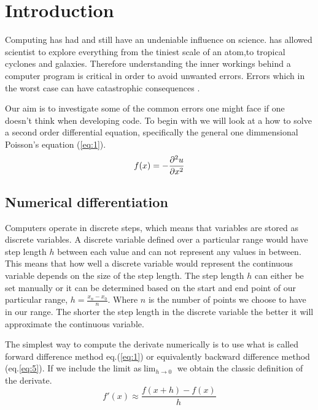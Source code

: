 \section*{Introduction}
Computing has had and still have an undeniable influence on science.
has allowed scientist to explore everything from the tiniest scale of an atom,to
tropical cyclones and galaxies.
Therefore understanding the inner workings behind a computer program is critical
in order to avoid unwanted errors. Errors which in the worst case can have
catastrophic consequences \cite{sleipner_failure}. \par Our aim is to
investigate some of the common errors one might face if one doesn't think when
developing code. To begin with we will look at a how to solve a second order
differential equation, specifically the general one dimmensional Poisson's
equation (\ref{eq:1}).
\begin{equation}\label{eq:2}
  f(x)= - \pd[^2u]{x^2}
\end{equation}

\subsection*{Numerical differentiation}
\par Computers operate in discrete steps, which means that variables are stored
as discrete variables. A discrete variable defined over a particular range would
have step length $h$ between each value and can not represent any values in
between. This means that how well a discrete variable would represent the
continuous variable depends on the size of the step length. The step length $h$
can either be set manually or it can be determined based on the start and end
point of our particular range, $h = \frac{x_n -x_0}{n}$. Where $n$ is the number
of points we choose to have in our range. The shorter the step length in the
discrete variable the better it will approximate the continuous variable.  
\par
The simplest way to compute the derivate numerically is to use what is called
forward difference method eq.(\ref{eq:1}) or equivalently backward difference
method (eq.\ref{eq:5}). If we include the limit as$\lim_{h\to 0}$ we obtain the
classic definition of the derivate. 
\begin{equation}\label{eq:1}
    f'(x) \approx \frac{f(x+h)-f(x)}{h}
\end{equation}

